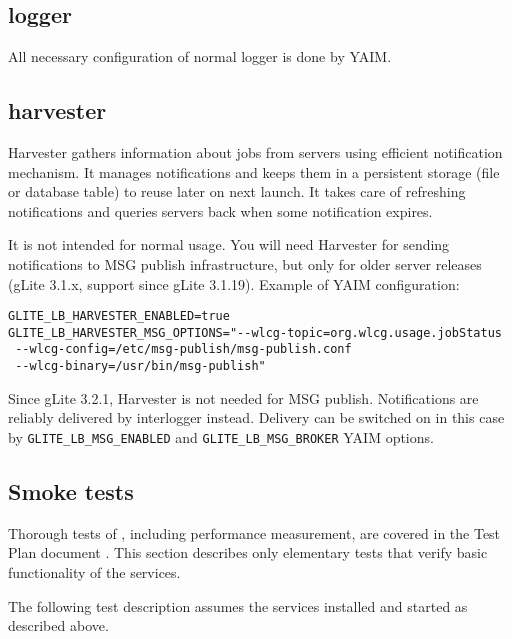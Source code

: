 \subsection{\LB logger}

All necessary configuration of normal \LB logger is done by YAIM.

\subsection{\LB harvester}

\LB Harvester gathers information about jobs from \LB servers using efficient
\LB notification mechanism. It manages notifications and keeps them in
a persistent storage (file or database table) to reuse later on next launch.
It takes care of refreshing notifications and queries \LB servers back when
some notification expires.

It is not intended for normal usage. You will need Harvester for sending notifications to MSG publish infrastructure, but only for older \LB server releases (gLite 3.1.x, support since gLite 3.1.19). Example of YAIM configuration:

\begin{verbatim}
GLITE_LB_HARVESTER_ENABLED=true
GLITE_LB_HARVESTER_MSG_OPTIONS="--wlcg-topic=org.wlcg.usage.jobStatus 
 --wlcg-config=/etc/msg-publish/msg-publish.conf 
 --wlcg-binary=/usr/bin/msg-publish"
\end{verbatim}

Since gLite 3.2.1, \LB Harvester is not needed for MSG publish. Notifications are reliably delivered by interlogger instead. Delivery can be switched on in this case by \texttt{GLITE\_LB\_MSG\_ENABLED} and \texttt{GLITE\_LB\_MSG\_BROKER} YAIM options.

\subsection{Smoke tests}

Thorough tests of \LB, including performance measurement, are
covered in the \LB Test Plan document \cite{lbtp}.
This section describes only elementary tests that verify basic
functionality of the services.

The following test description assumes the \LB services installed
and started as described above.

\def\req{\noindent\textbf{Prerequisities:}\xspace}
\def\how{\noindent\textbf{How to run:}\xspace}
\def\result{\noindent\textbf{Expected result:}\xspace}

